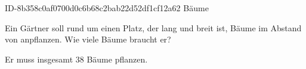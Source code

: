\begin{exercise}
      {ID-8b358c0af0700d0c6b68c2bab22d52df1cf12a62}
      {Bäume}
  \ifproblem\problem\par
    Ein Gärtner soll rund um einen Platz, der  lang und 
    breit ist, Bäume im Abstand von  anpflanzen. Wie viele Bäume
    braucht er?
  \fi
  \ifoutcome\outcome\par
    Er muss insgesamt \num{38} Bäume pflanzen.
  \fi
\end{exercise}
